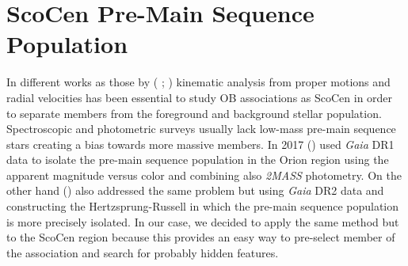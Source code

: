 
\section{ScoCen Pre-Main Sequence Population}

In different works as those by ( \citeyear{1999AJ....117..354D};  \citeyear{2018MNRAS.tmp..210W}) kinematic analysis from proper motions and radial velocities has been essential to study OB associations as ScoCen in order to separate members from the foreground and background stellar population. Spectroscopic and photometric surveys usually lack low-mass pre-main sequence stars creating a bias towards more massive members. In 2017  (\citeyear{Zari17}) used \textit{Gaia} DR1 data to isolate the pre-main sequence population in the Orion region using the apparent magnitude versus color and combining also \textit{2MASS} photometry. On the other hand  (\citeyear{Skrutskie06}) also addressed the same problem but using \textit{Gaia} DR2 data and constructing the Hertzsprung-Russell in which the pre-main sequence population is more precisely isolated. In our case, we decided to apply the same method but to the ScoCen region because this provides an easy way to pre-select member of the association and search for probably hidden features.\\

